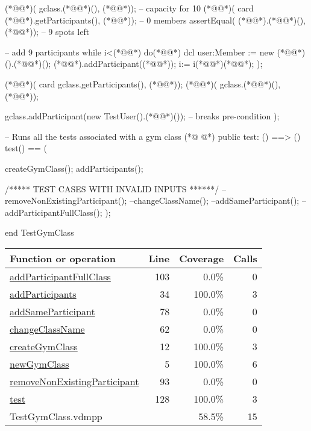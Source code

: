 \begin{vdmpp}[breaklines=true]
    (*@@*)( gclass.(*@@*)(), (*@@*));          -- capacity for 10 
    (*@@*)( card (*@@*).getParticipants(), (*@@*));   -- 0 members
    assertEqual( (*@@*).(*@@*)(), (*@@*));         -- 9 spots left
    
     -- add 9 participants
     while i<(*@@*) do(*@\vdmnotcovered{(}@*)
       dcl user:Member := new (*@@*)().(*@@*)();
       (*@@*).addParticipant((*@@*));
       i:= i(*@\vdmnotcovered{+}@*)(*@@*);
    ); 
       
    (*@@*)( card gclass.getParticipants(), (*@@*));
    (*@@*)( gclass.(*@@*)(), (*@@*));
    
    gclass.addParticipant(new TestUser().(*@@*)()); -- breaks pre-condition
 );
 
 
 -- Runs all the tests associated with a gym class
(*@
\label{test:128}
@*)
 public test: () ==> ()
 test() == (
  
   createGymClass();
    addParticipants();
    
    /***** TEST CASES WITH INVALID INPUTS ******/
    --removeNonExistingParticipant();
    --changeClassName();
    --addSameParticipant();
    --addParticipantFullClass();
 );

 
end TestGymClass
\end{vdmpp}
\bigskip
\begin{longtable}{|l|r|r|r|}
\hline
Function or operation & Line & Coverage & Calls \\
\hline
\hline
\hyperref[addParticipantFullClass:103]{addParticipantFullClass} & 103&0.0\% & 0 \\
\hline
\hyperref[addParticipants:34]{addParticipants} & 34&100.0\% & 3 \\
\hline
\hyperref[addSameParticipant:78]{addSameParticipant} & 78&0.0\% & 0 \\
\hline
\hyperref[changeClassName:62]{changeClassName} & 62&0.0\% & 0 \\
\hline
\hyperref[createGymClass:12]{createGymClass} & 12&100.0\% & 3 \\
\hline
\hyperref[newGymClass:5]{newGymClass} & 5&100.0\% & 6 \\
\hline
\hyperref[removeNonExistingParticipant:93]{removeNonExistingParticipant} & 93&0.0\% & 0 \\
\hline
\hyperref[test:128]{test} & 128&100.0\% & 3 \\
\hline
\hline
TestGymClass.vdmpp & & 58.5\% & 15 \\
\hline
\end{longtable}

